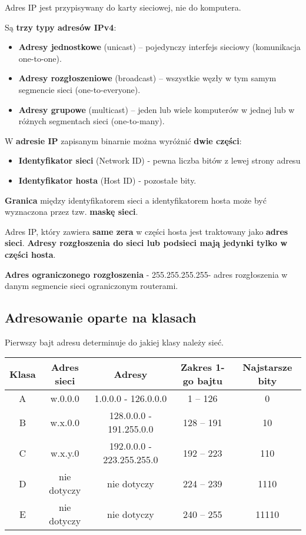 \documentclass[../main.tex]{subfiles}
\begin{document}
    Adres IP jest przypisywany do karty sieciowej, nie do komputera.

    Są \textbf{trzy typy adresów IPv4}:
    \begin{itemize}
        \item \textbf{Adresy jednostkowe} (unicast) – pojedynczy interfejs sieciowy (komunikacja one-to-one).
        \item \textbf{Adresy rozgłoszeniowe} (broadcast) – wszystkie węzły w tym samym segmencie sieci (one-to-everyone).
        \item \textbf{Adresy grupowe} (multicast) – jeden lub wiele komputerów w jednej lub w różnych segmentach sieci (one-to-many).
    \end{itemize}

    W \textbf{adresie IP} zapisanym binarnie można wyróżnić \textbf{dwie części}:
    \begin{itemize}
        \item \textbf{Identyfikator sieci} (Network ID) - pewna liczba bitów z lewej strony adresu
        \item \textbf{Identyfikator hosta} (Host ID) - pozostałe bity.
    \end{itemize}
   \textbf{Granica} między identyfikatorem sieci a identyfikatorem hosta może być wyznaczona przez
    tzw. \textbf{maskę sieci}.

    Adres IP, który zawiera \textbf{same zera} w części hosta jest traktowany jako \textbf{adres sieci}.
    \textbf{Adresy rozgłoszenia do sieci lub podsieci mają jedynki tylko w części hosta}.

    \textbf{Adres ograniczonego rozgłoszenia} - 255.255.255.255- adres rozgłoszenia
    w danym segmencie sieci ograniczonym routerami.\\

    \subsection{Adresowanie oparte na klasach}

    Pierwszy bajt adresu determinuje do jakiej klasy należy sieć.

    \begin{tabular}{|c|c|c|c|c|}
        \hline
        Klasa & Adres sieci & Adresy & Zakres 1-go bajtu & Najstarsze bity\\
        \hline
        A & w.0.0.0 & 1.0.0.0 - 126.0.0.0 & 1 – 126 & 0\\
        \hline
        B & w.x.0.0 & 128.0.0.0 - 191.255.0.0 & 128 – 191 & 10\\
        \hline
        C & w.x.y.0 & 192.0.0.0 - 223.255.255.0 & 192 – 223 & 110\\
        \hline
        D & nie dotyczy & nie dotyczy & 224 – 239 & 1110\\
        \hline
        E & nie dotyczy & nie dotyczy & 240 – 255 & 11110\\
        \hline
    \end{tabular}
\end{document}
